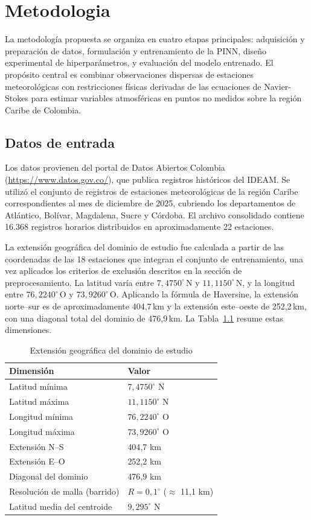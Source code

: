 \chapter{Metodologia}

La metodología propuesta se organiza en cuatro etapas principales: adquisición y preparación de datos, formulación y entrenamiento de la PINN, diseño experimental de hiperparámetros, y evaluación del modelo entrenado. El propósito central es combinar observaciones dispersas de estaciones meteorológicas con restricciones físicas derivadas de las ecuaciones de Navier-Stokes para estimar variables atmosféricas en puntos no medidos sobre la región Caribe de Colombia.

\section{Datos de entrada}

Los datos provienen del portal de Datos Abiertos Colombia (\url{https://www.datos.gov.co/}), que publica registros históricos del IDEAM. Se utilizó el conjunto de registros de estaciones meteorológicas de la región Caribe correspondientes al mes de diciembre de 2025, cubriendo los departamentos de Atlántico, Bolívar, Magdalena, Sucre y Córdoba. El archivo consolidado contiene 16.368 registros horarios distribuidos en aproximadamente 22 estaciones.

La extensión geográfica del dominio de estudio fue calculada a partir de las coordenadas de las 18 estaciones que integran el conjunto de entrenamiento, una vez aplicados los criterios de exclusión descritos en la sección de preprocesamiento. La latitud varía entre $7{,}4750^{\circ}$\,N y $11{,}1150^{\circ}$\,N, y la longitud entre $76{,}2240^{\circ}$\,O y $73{,}9260^{\circ}$\,O. Aplicando la fórmula de Haversine, la extensión norte–sur es de aproximadamente 404{,}7\,km y la extensión este–oeste de 252{,}2\,km, con una diagonal total del dominio de 476{,}9\,km. La Tabla~\ref{tab:dominio_geografico} resume estas dimensiones.

\begin{table}[H]
\centering
\caption{Extensión geográfica del dominio de estudio}
\label{tab:dominio_geografico}
\begin{tabular}{ll}
\hline
Dimensión & Valor \\
\hline
Latitud mínima & $7{,}4750^{\circ}$ N \\
Latitud máxima & $11{,}1150^{\circ}$ N \\
Longitud mínima & $76{,}2240^{\circ}$ O \\
Longitud máxima & $73{,}9260^{\circ}$ O \\
Extensión N--S & 404{,}7 km \\
Extensión E--O & 252{,}2 km \\
Diagonal del dominio & 476{,}9 km \\
Resolución de malla (barrido) & $R = 0{,}1^{\circ}$ ($\approx$ 11{,}1 km) \\
Latitud media del centroide & $9{,}295^{\circ}$ N \\
\hline
\end{tabular}
\end{table}

